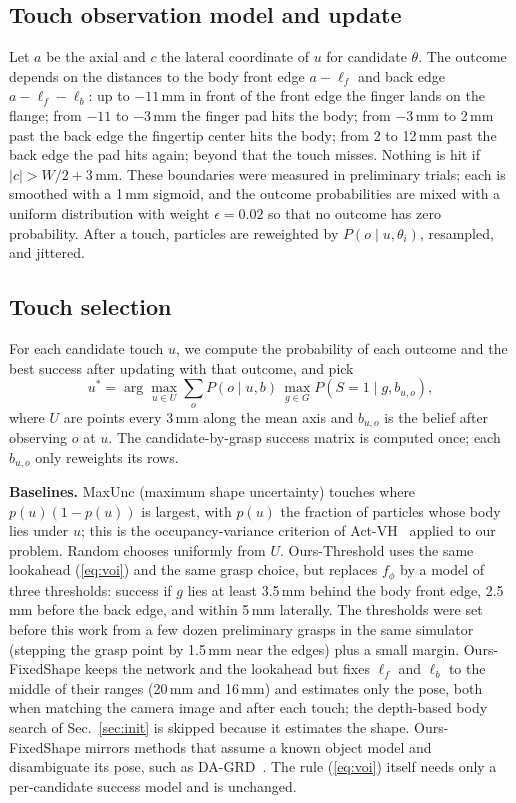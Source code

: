 \documentclass[conference]{IEEEtran}
\newcommand{\Unc}{MaxUnc}
\newcommand{\Rand}{Random}
\newcommand{\Geom}{Ours-Threshold}
\newcommand{\Fix}{Ours-FixedShape}
\begin{document}
\subsection{Touch observation model and update}\label{sec:obs}
Let $a$ be the axial and $c$ the lateral coordinate of $u$ for candidate $\theta$. The outcome depends on the distances to the body front edge $a-\ell_f$ and back edge $a-\ell_f-\ell_b$: up to $-11$\,mm in front of the front edge the finger lands on the flange; from $-11$ to $-3$\,mm the finger pad hits the body; from $-3$\,mm to 2\,mm past the back edge the fingertip center hits the body; from 2 to 12\,mm past the back edge the pad hits again; beyond that the touch misses. Nothing is hit if $|c|>W/2+3$\,mm. These boundaries were measured in preliminary trials; each is smoothed with a 1\,mm sigmoid, and the outcome probabilities are mixed with a uniform distribution with weight $\epsilon=0.02$ so that no outcome has zero probability. After a touch, particles are reweighted by $P(o\mid u,\theta_i)$, resampled, and jittered.

\subsection{Touch selection}\label{sec:touchsel}
For each candidate touch $u$, we compute the probability of each outcome and the best success after updating with that outcome, and pick
\begin{equation}
u^*=\arg\max_{u\in U}\sum_{o} P(o\mid u,b)\,\max_{g\in G} P(S{=}1\mid g,b_{u,o}),
\label{eq:voi}
\end{equation}
where $U$ are points every 3\,mm along the mean axis and $b_{u,o}$ is the belief after observing $o$ at $u$. The candidate-by-grasp success matrix is computed once; each $b_{u,o}$ only reweights its rows.

\textbf{Baselines.} \Unc{} (maximum shape uncertainty) touches where $p(u)(1-p(u))$ is largest, with $p(u)$ the fraction of particles whose body lies under $u$; this is the occupancy-variance criterion of Act-VH~\cite{rustler2022actvh} applied to our problem. \Rand{} chooses uniformly from $U$. \Geom{} uses the same lookahead (\ref{eq:voi}) and the same grasp choice, but replaces $f_\phi$ by a model of three thresholds: success if $g$ lies at least 3.5\,mm behind the body front edge, 2.5\,mm before the back edge, and within 5\,mm laterally. The thresholds were set before this work from a few dozen preliminary grasps in the same simulator (stepping the grasp point by 1.5\,mm near the edges) plus a small margin. \Fix{} keeps the network and the lookahead but fixes $\ell_f$ and $\ell_b$ to the middle of their ranges (20\,mm and 16\,mm) and estimates only the pose, both when matching the camera image and after each touch; the depth-based body search of Sec.~\ref{sec:init} is skipped because it estimates the shape. \Fix{} mirrors methods that assume a known object model and disambiguate its pose, such as DA-GRD~\cite{wang2026dagrd}. The rule (\ref{eq:voi}) itself needs only a per-candidate success model and is unchanged.
\end{document}
